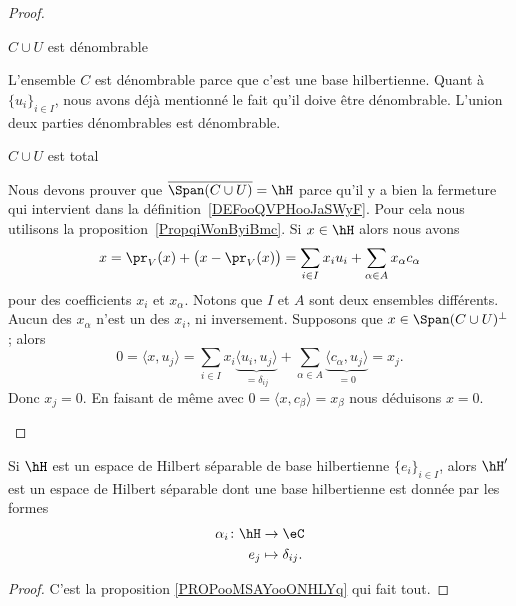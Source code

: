 \begin{proof}
\begin{subproof}
		\item[\( C\cup U\) est dénombrable]

		L'ensemble \( C\) est dénombrable parce que c'est une base hilbertienne. Quant à \( \{ u_i \}_{i\in I}\), nous avons déjà mentionné le fait qu'il doive être dénombrable. L'union deux parties dénombrables est dénombrable.

		\item[\( C\cup U\) est total]

		Nous devons prouver que \( \overline{ \Span(C\cup U) }=\hH\) parce qu'il y a bien la fermeture qui intervient dans la définition~\ref{DEFooQVPHooJaSWyF}. Pour cela nous utilisons la proposition~\ref{PropqiWonByiBmc}.
		Si \( x\in \hH\) alors nous avons
		\begin{equation}
			x=\pr_V(x)+\big( x-\pr_V(x) \big)=\sum_{i\in I}x_iu_i+\sum_{\alpha\in A}x_{\alpha}c_{\alpha}
		\end{equation}
		pour des coefficients \( x_i\) et \( x_{\alpha}\). Notons que \( I\) et \( A\) sont deux ensembles différents. Aucun des \( x_{\alpha}\) n'est un des \( x_i\), ni inversement. Supposons que \( x\in \Span(C\cup U)^{\perp}\); alors
		\begin{equation}
			0=\langle x, u_j\rangle =\sum_{i\in I}x_i\underbrace{\langle u_i, u_j\rangle }_{=\delta_{ij}}+\sum_{\alpha\in A}\underbrace{\langle c_{\alpha}, u_j\rangle }_{=0}=x_j.
		\end{equation}
		Donc \( x_j=0\). En faisant de même avec \( 0=\langle x, c_{\beta}\rangle =x_{\beta}\) nous déduisons \( x=0\).
	\end{subproof}
\end{proof}

\begin{proposition}      \label{PROPooZQIAooUEWLtg}
	Si \( \hH\) est un espace de Hilbert séparable de base hilbertienne \( \{ e_i \}_{i\in I}\), alors \( \hH'\) est un espace de Hilbert séparable dont une base hilbertienne est donnée par les formes
	\begin{equation}
		\begin{aligned}
			\alpha_i\colon \hH & \to \eC              \\
			e_j                & \mapsto \delta_{ij}.
		\end{aligned}
	\end{equation}
\end{proposition}

\begin{proof}
	C'est la proposition \ref{PROPooMSAYooONHLYq} qui fait tout.
\end{proof}

